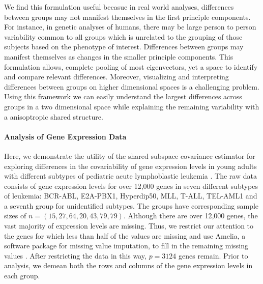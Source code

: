 \documentclass{article}
\begin{document}
We find this formulation useful becasue in real world analyses,
differences between groups may not manifest themselves in the first
principle components.  For instance, in genetic analyses of humans,
there may be large person to person variability common to all groups
which is unrelated to the grouping of those subjects based on the
phenotype of interest.  Differences between groups may manifest themselves
as changes in the smaller principle components. This formulation
allows, complete pooling of most eigenvectors, yet a space to identify
and compare relevant differences.  Moreover, visualizing and
interpreting differences between groups on higher dimensional spaces
is a challenging problem.  Using this framework we can easily understand the
largest differences across groups in a two dimensional space while
explaining the remaining variability with a anisoptropic shared
structure.

\paragraph{Analysis of Gene Expression Data}

Here, we demonstrate the utility of the shared subspace
covariance estimator for exploring differences in the covariability of
gene expression levels in young adults with different subtypes of
pediatric acute lymphoblastic leukemia \citep{Yeoh2002}.  The raw data
consists of gene expression levels for over 12,000 genes in seven
different subtypes of leukemia: BCR-ABL, E2A-PBX1, Hyperdip50, MLL,
T-ALL, TEL-AML1 and a seventh group for unidentified subtypes.  The
groups have corresponding sample sizes of
$n = (15, 27, 64, 20, 43, 79, 79)$.  Although there are over 12,000
genes, the vast majority of expression levels are missing.
Thus, we restrict our attention to the genes for which less than half
of the values are missing and use Amelia, a software package for
missing value imputation, to fill in the remaining missing values
\citep{Amelia}.  After restricting the data in this way, $p=3124$
genes remain.  Prior to analysis, we demean both the rows and columns of
the gene expression levels in each group.
\end{document}
